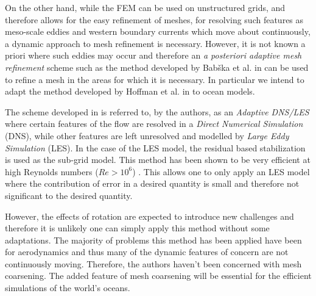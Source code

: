 On the other hand, while the FEM can be used on unstructured grids, and
therefore allows for the easy refinement of meshes, for resolving such
features as meso-scale eddies and western boundary currents which move about
continuously, a dynamic approach to mesh refinement is necessary.  However, it
is not known a priori where such eddies may occur and therefore an \emph{a
posteriori adaptive mesh refinement} scheme such as the method developed by
Bab{\v{s}}ka et al. in \cite{Babuska1978} can be used to refine a mesh in the
areas for which it is necessary. In particular we intend to adapt the method
developed by Hoffman et al. in \cite{Hoffman2004} to ocean models. 

The scheme developed in \cite{Hoffman2004} is referred to, by the authors, as
an \emph{Adaptive DNS/LES} where certain features of the flow are resolved in a
\emph{Direct Numerical Simulation} (DNS), while other features are left
unresolved and modelled by \emph{Large Eddy Simulation} (LES). In the case of
the LES model, the residual based stabilization is used as the sub-grid model.
This method has been shown to be very efficient at high Reynolds numbers
($Re>10^6$) \cite{Jansson2011}. This allows one to only apply an LES model
where the contribution of error in a desired quantity is small and therefore
not significant to the desired quantity.

However, the effects of rotation are expected to introduce new challenges and
therefore it is unlikely one can simply apply this method without some
adaptations. The majority of problems this method has been applied have been
for aerodynamics and thus many of the dynamic features of concern are not
continuously moving. Therefore, the authors haven't been concerned with mesh
coarsening. The added feature of mesh coarsening will be essential for the
efficient simulations of the world's oceans.
